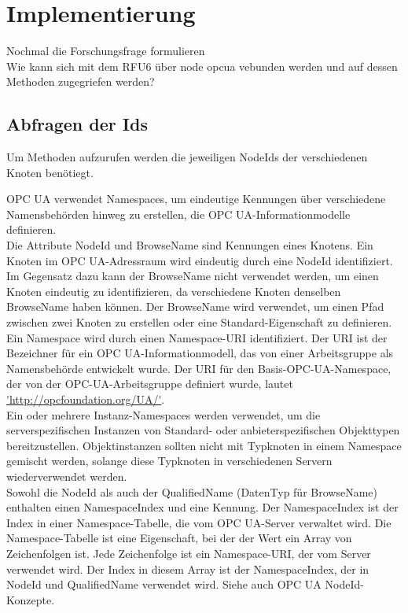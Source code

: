 \chapter{Implementierung}
Nochmal die Forschungsfrage formulieren\\
Wie kann sich mit dem RFU6 über node opcua vebunden werden und auf dessen Methoden zugegriefen werden?


\section{Abfragen der Ids}
Um Methoden aufzurufen werden die jeweiligen NodeIds der verschiedenen Knoten benötiegt. 

OPC UA verwendet Namespaces, um eindeutige Kennungen über verschiedene Namensbehörden hinweg zu erstellen, die OPC UA-Informationmodelle definieren.\\

Die Attribute NodeId und BrowseName sind Kennungen eines Knotens. Ein Knoten im OPC UA-Adressraum wird eindeutig durch eine NodeId identifiziert. Im Gegensatz dazu kann der BrowseName nicht verwendet werden, um einen Knoten eindeutig zu identifizieren, da verschiedene Knoten denselben BrowseName haben können. Der BrowseName wird verwendet, um einen Pfad zwischen zwei Knoten zu erstellen oder eine Standard-Eigenschaft zu definieren.\\

Ein Namespace wird durch einen Namespace-URI identifiziert. Der URI ist der Bezeichner für ein OPC UA-Informationmodell, das von einer Arbeitsgruppe als Namensbehörde entwickelt wurde. Der URI für den Basis-OPC-UA-Namespace, der von der OPC-UA-Arbeitsgruppe definiert wurde, lautet \url{'http://opcfoundation.org/UA/'}.\\

Ein oder mehrere Instanz-Namespaces werden verwendet, um die serverspezifischen Instanzen von Standard- oder anbieterspezifischen Objekttypen bereitzustellen. Objektinstanzen sollten nicht mit Typknoten in einem Namespace gemischt werden, solange diese Typknoten in verschiedenen Servern wiederverwendet werden.\cite{.01.03.2021}\\

Sowohl die NodeId als auch der QualifiedName (DatenTyp für BrowseName) enthalten einen NamespaceIndex und eine Kennung. Der NamespaceIndex ist der Index in einer Namespace-Tabelle, die vom OPC UA-Server verwaltet wird. Die Namespace-Tabelle ist eine Eigenschaft, bei der der Wert ein Array von Zeichenfolgen ist. Jede Zeichenfolge ist ein Namespace-URI, der vom Server verwendet wird. Der Index in diesem Array ist der NamespaceIndex, der in NodeId und QualifiedName verwendet wird. Siehe auch OPC UA NodeId-Konzepte.\\

